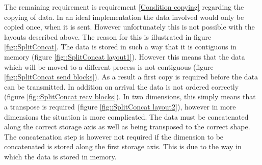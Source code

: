 The remaining requirement is requirement \ref{Condition copying} regarding the copying of data. In an ideal implementation the data involved would only be copied once, when it is sent. However unfortunately this is not possible with the layouts described above. The reason for this is illustrated in figure \ref{fig::SplitConcat}. The data is stored in such a way that it is contiguous in memory (figure \ref{fig::SplitConcat layout1}). However this means that the data which will be moved to a different process is not contiguous (figure \ref{fig::SplitConcat send blocks}). As a result a first copy is required before the data can be transmitted. In addition on arrival the data is not ordered correctly (figure \ref{fig::SplitConcat recv blocks}). In two dimensions, this simply means that a transpose is required (figure \ref{fig::SplitConcat layout2}), however in more dimensions the situation is more complicated. The data must be concatenated along the correct storage axis as well as being transposed to the correct shape. The concatenation step is however not required if the dimension to be concatenated is stored along the first storage axis. This is due to the way in which the data is stored in memory.

